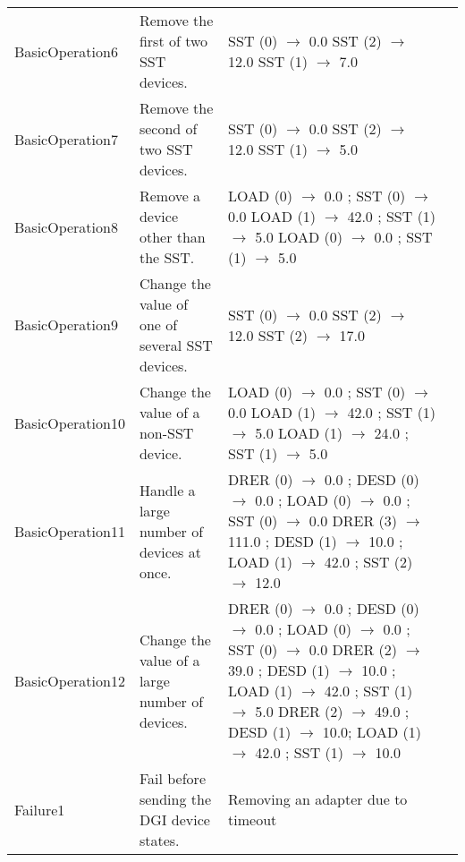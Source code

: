 \documentclass{article}
\begin{document}
\begin{center}
\begin{footnotesize}
\begin{longtable}{|p{3cm}|p{4cm}|p{10cm}|c|}
    BasicOperation6 & Remove the first of two SST devices. & SST (0) $\rightarrow$ 0.0 \newline SST (2) $\rightarrow$ 12.0 \newline SST (1) $\rightarrow$ 7.0 & \\
    BasicOperation7 & Remove the second of two SST devices. & SST (0) $\rightarrow$ 0.0 \newline SST (2) $\rightarrow$ 12.0 \newline SST (1) $\rightarrow$ 5.0 & \\
    BasicOperation8 & Remove a device other than the SST. & LOAD (0) $\rightarrow$ 0.0 ; SST (0) $\rightarrow$ 0.0 \newline LOAD (1) $\rightarrow$ 42.0 ; SST (1) $\rightarrow$ 5.0 \newline LOAD (0) $\rightarrow$ 0.0 ; SST (1) $\rightarrow$ 5.0 & \\
    BasicOperation9 & Change the value of one of several SST devices. & SST (0) $\rightarrow$ 0.0 \newline SST (2) $\rightarrow$ 12.0 \newline SST (2) $\rightarrow$ 17.0 & \\
    BasicOperation10 & Change the value of a non-SST device. & LOAD (0) $\rightarrow$ 0.0 ; SST (0) $\rightarrow$ 0.0 \newline LOAD (1) $\rightarrow$ 42.0 ; SST (1) $\rightarrow$ 5.0 \newline LOAD (1) $\rightarrow$ 24.0 ; SST (1) $\rightarrow$ 5.0 & \\
    BasicOperation11 & Handle a large number of devices at once. & DRER (0) $\rightarrow$ 0.0 ; DESD (0) $\rightarrow$ 0.0 ; LOAD (0) $\rightarrow$ 0.0 ; SST (0) $\rightarrow$ 0.0 \newline DRER (3) $\rightarrow$ 111.0 ; DESD (1) $\rightarrow$ 10.0 ; LOAD (1) $\rightarrow$ 42.0 ; SST (2) $\rightarrow$ 12.0 & \\
    BasicOperation12 & Change the value of a large number of devices. & DRER (0) $\rightarrow$ 0.0 ; DESD (0) $\rightarrow$ 0.0 ; LOAD (0) $\rightarrow$ 0.0 ; SST (0) $\rightarrow$ 0.0 \newline DRER (2) $\rightarrow$ 39.0 ; DESD (1) $\rightarrow$ 10.0 ; LOAD (1) $\rightarrow$ 42.0 ; SST (1) $\rightarrow$ 5.0 \newline DRER (2) $\rightarrow$ 49.0 ; DESD (1) $\rightarrow$ 10.0; LOAD (1) $\rightarrow$ 42.0 ; SST (1) $\rightarrow$ 10.0 & \\
    Failure1 & Fail before sending the DGI device states. & Removing an adapter due to timeout & \\

\end{longtable}
\end{footnotesize}
\end{center}
\end{document}
